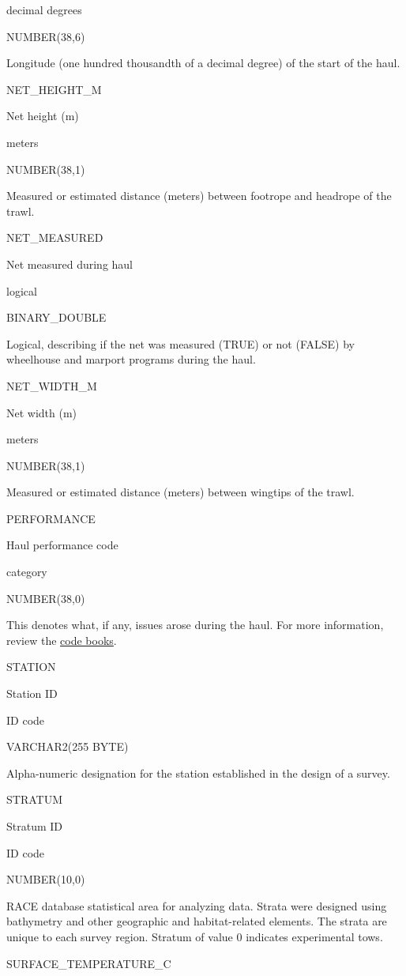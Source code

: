 \documentclass[
  letterpaper,
  oneside,
  open=any]{scrbook}
\begin{document}
decimal degrees

NUMBER(38,6)

Longitude (one hundred thousandth of a decimal degree) of the start of
the haul.

NET\_HEIGHT\_M

Net height (m)

meters

NUMBER(38,1)

Measured or estimated distance (meters) between footrope and headrope of
the trawl.

NET\_MEASURED

Net measured during haul

logical

BINARY\_DOUBLE

Logical, describing if the net was measured (TRUE) or not (FALSE) by
wheelhouse and marport programs during the haul.

NET\_WIDTH\_M

Net width (m)

meters

NUMBER(38,1)

Measured or estimated distance (meters) between wingtips of the trawl.

PERFORMANCE

Haul performance code

category

NUMBER(38,0)

This denotes what, if any, issues arose during the haul. For more
information, review the
\href{https://www.fisheries.noaa.gov/resource/document/groundfish-survey-species-code-manual-and-data-codes-manual}{code
books}.

STATION

Station ID

ID code

VARCHAR2(255 BYTE)

Alpha-numeric designation for the station established in the design of a
survey.

STRATUM

Stratum ID

ID code

NUMBER(10,0)

RACE database statistical area for analyzing data. Strata were designed
using bathymetry and other geographic and habitat-related elements. The
strata are unique to each survey region. Stratum of value 0 indicates
experimental tows.

SURFACE\_TEMPERATURE\_C
\end{document}

